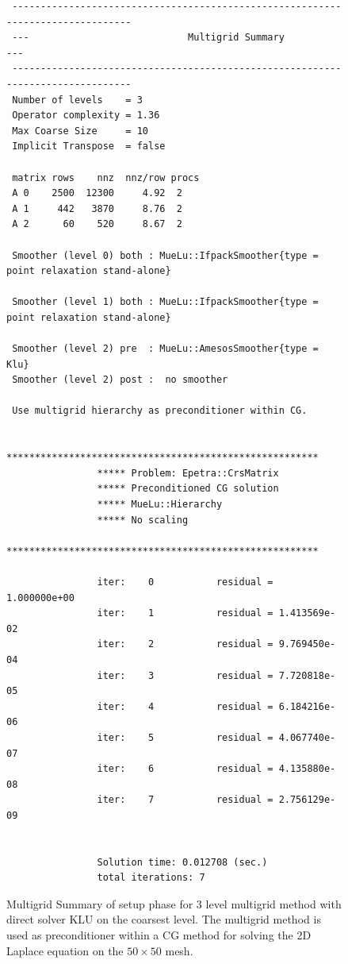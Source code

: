 \documentclass[12pt,a4paper]{article}
\begin{document}
\begin{figure}
\tiny
\begin{minipage}{\textwidth}
\begin{verbatim}
 --------------------------------------------------------------------------------
 ---                            Multigrid Summary                             ---
 --------------------------------------------------------------------------------
 Number of levels    = 3
 Operator complexity = 1.36
 Max Coarse Size     = 10
 Implicit Transpose  = false
 
 matrix rows    nnz  nnz/row procs
 A 0    2500  12300     4.92  2
 A 1     442   3870     8.76  2
 A 2      60    520     8.67  2
 
 Smoother (level 0) both : MueLu::IfpackSmoother{type = point relaxation stand-alone}
 
 Smoother (level 1) both : MueLu::IfpackSmoother{type = point relaxation stand-alone}
 
 Smoother (level 2) pre  : MueLu::AmesosSmoother{type = Klu}
 Smoother (level 2) post :  no smoother
 
 Use multigrid hierarchy as preconditioner within CG.

                *******************************************************
                ***** Problem: Epetra::CrsMatrix
                ***** Preconditioned CG solution
                ***** MueLu::Hierarchy
                ***** No scaling
                *******************************************************

                iter:    0           residual = 1.000000e+00
                iter:    1           residual = 1.413569e-02
                iter:    2           residual = 9.769450e-04
                iter:    3           residual = 7.720818e-05
                iter:    4           residual = 6.184216e-06
                iter:    5           residual = 4.067740e-07
                iter:    6           residual = 4.135880e-08
                iter:    7           residual = 2.756129e-09


                Solution time: 0.012708 (sec.)
                total iterations: 7
\end{verbatim}
\end{minipage}
\caption{Multigrid Summary of setup phase for 3 level multigrid method with direct solver KLU on the coarsest level. The multigrid method is used as preconditioner within a CG method for solving the 2D Laplace equation on the $50\times 50$ mesh.}
\label{fig:directsolver}
\end{figure}
\end{document}
